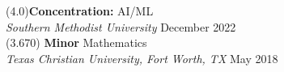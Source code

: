 
 	 (4.0)\hfill \textbf{Concentration:} AI/ML\\
\textit{Southern Methodist University}  \hfill December 2022\\

  (3.670) \hfill \textbf{Minor} Mathematics\\
\textit{Texas Christian University, Fort Worth, TX}  \hfill May 2018\\